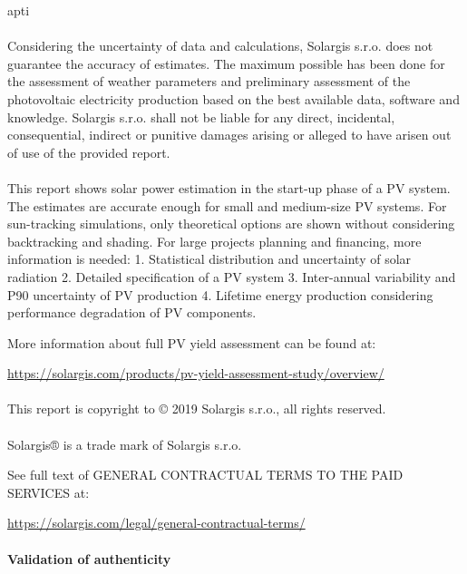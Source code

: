 apti     \documentclass[10pt,a4paper,UTF8]{article}
\begin{document}
{\paragraph{} Considering the uncertainty of data and calculations, Solargis s.r.o. does not guarantee the accuracy of estimates. The maximum possible has been done for the assessment of weather parameters and preliminary assessment of the photovoltaic electricity production based on the best available data, software and knowledge. Solargis s.r.o. shall not be liable for any direct, incidental, consequential, indirect or punitive damages arising or alleged to have arisen out of use of the provided report.\paragraph{} This report shows solar power estimation in the start-up phase of a PV system. The estimates are accurate enough for small and medium-size PV systems. For sun-tracking simulations, only theoretical options are shown without considering backtracking and shading. For large projects planning and financing, more information is needed: 1. Statistical distribution and uncertainty of solar radiation 2. Detailed specification of a PV system 3. Inter-annual variability and P90 uncertainty of PV production 4. Lifetime energy production considering performance degradation of PV components.\begin{description}[noitemsep]
\item More information about full PV yield assessment can be found at:\item \url{https://solargis.com/products/pv-yield-assessment-study/overview/}
\end{description}\paragraph{} This report is copyright to © 2019 Solargis s.r.o., all rights reserved.\paragraph{} Solargis® is a trade mark of Solargis s.r.o.\begin{description}[noitemsep]
\item See full text of GENERAL CONTRACTUAL TERMS TO THE PAID SERVICES at:\item \url{https://solargis.com/legal/general-contractual-terms/}
\end{description}\paragraph{}\textbf{Validation of authenticity}\begin{description}[noitemsep]

\end{description}}
\end{document}
